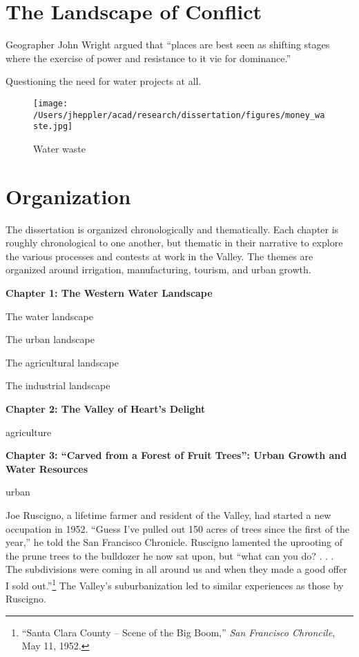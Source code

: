 \documentclass[11pt,article,oneside]{memoir}
\makeatletter
\def\maxwidth{\ifdim\Gin@nat@width>\linewidth\linewidth
\else\Gin@nat@width\fi}
\let\Oldincludegraphics\includegraphics
\renewcommand{\includegraphics}[1]{\Oldincludegraphics[width=\maxwidth]{#1}}
\makeatother
\begin{document}
\section{The Landscape of Conflict}

Geographer John Wright argued that ``places are best seen as shifting
stages where the exercise of power and resistance to it vie for
dominance.''

Questioning the need for water projects at all.

\begin{figure}[htbp]
\centering
\texttt{[image: /Users/jheppler/acad/research/dissertation/figures/money\_waste.jpg]}
\caption{Water waste}
\end{figure}

\section{Organization}

The dissertation is organized chronologically and thematically. Each
chapter is roughly chronological to one another, but thematic in their
narrative to explore the various processes and contests at work in the
Valley. The themes are organized around irrigation, manufacturing,
tourism, and urban growth.

\textbf{Chapter 1: The Western Water Landscape}

The water landscape

The urban landscape

The agricultural landscape

The industrial landscape

\textbf{Chapter 2: The Valley of Heart's Delight}

agriculture

\textbf{Chapter 3: ``Carved from a Forest of Fruit Trees'': Urban Growth
and Water Resources}

urban

Joe Ruscigno, a lifetime farmer and resident of the Valley, had started
a new occupation in 1952. ``Guess I've pulled out 150 acres of trees
since the first of the year,'' he told the San Francisco Chronicle.
Ruscigno lamented the uprooting of the prune trees to the bulldozer he
now sat upon, but ``what can you do? . . . The subdivisions were coming
in all around us and when they made a good offer I sold out.''\footnote{``Santa
  Clara County -- Scene of the Big Boom,'' \emph{San Francisco
  Chroncile}, May 11, 1952.} The Valley's suburbanization led to similar
experiences as those by Ruscigno.
\end{document}
